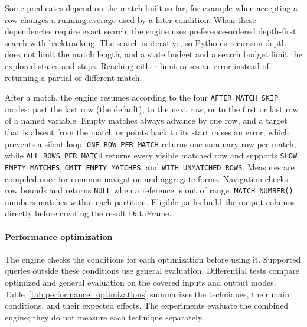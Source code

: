 \documentclass[preprint,12pt,times,a4paper]{elsarticle}
\begin{document}
Some predicates depend on the match built so far, for example when accepting a
row changes a running average used by a later condition. When these dependencies
require exact search, the engine uses preference-ordered depth-first search
with backtracking. The search is
iterative, so Python's recursion depth does not limit the match length, and a
state budget and a search budget limit the explored states and steps.
Reaching either limit raises an error instead of returning a partial or
different match.

After a match, the engine resumes according to the four
\texttt{AFTER MATCH SKIP} modes: past the last row (the default), to the next
row, or to the first or last row of a named variable. Empty matches always
advance by one row, and a target that is absent from the match or points back
to its start raises an error, which prevents a silent loop.
\texttt{ONE ROW PER MATCH} returns one summary row per match, while
\texttt{ALL ROWS PER MATCH} returns every visible matched row and supports
\texttt{SHOW EMPTY MATCHES}, \texttt{OMIT EMPTY MATCHES}, and
\texttt{WITH UNMATCHED ROWS}. Measures are compiled once for common navigation
and aggregate forms. Navigation checks row bounds and returns \texttt{NULL}
when a reference is out of range. \texttt{MATCH\_NUMBER()} numbers matches
within each partition. Eligible paths build the output columns directly
before creating the result DataFrame.

\paragraph{Performance optimization}
The engine checks the conditions for each optimization before using it.
Supported queries outside these conditions use general evaluation.
Differential tests compare optimized and general evaluation on the covered
inputs and output modes. Table~\ref{tab:performance_optimizations} summarizes
the techniques, their main conditions, and their expected effects. The
experiments evaluate the combined engine; they do not measure each technique
separately.
\end{document}
